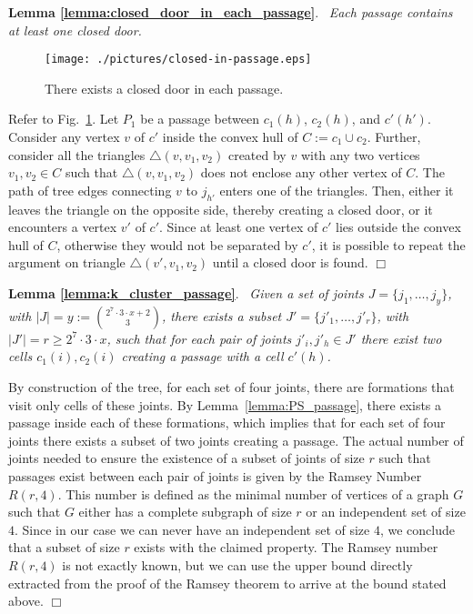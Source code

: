\documentclass[a4paper,10pt]{llncs}
\newcounter{prop}
\renewenvironment{proof}
{{\bf Proof:}}{\hspace*{\fill}$\Box$\par\vspace{2mm}}
\newcommand{\rephrase}[3]{\noindent\textbf{#1 #2}.~\emph{#3}}
\begin{document}
\rephrase{Lemma}{\ref{lemma:closed_door_in_each_passage}}{
Each passage contains at least one closed door.
}

\begin{figure}[ht]
\begin{center}
\texttt{[image: ./pictures/closed-in-passage.eps]}
\caption{There exists a closed door in each passage.}
\label{fig:closed_door_in_passage}
\end{center}
\end{figure}
\begin{proof}
Refer to Fig.~\ref{fig:closed_door_in_passage}. Let $P_1$ be a passage between $c_1(h)$, $c_2(h)$, and $c'(h')$. Consider any vertex $v$ of $c'$ inside the convex hull of $C:= c_1\cup c_2$. Further, consider all the triangles $\triangle(v,v_1,v_2)$ created by $v$ with any two vertices $v_1,v_2 \in C$ such that $\triangle(v,v_1,v_2)$ does not enclose any other vertex of $C$. The path of tree edges connecting $v$ to $j_{h'}$ enters one of the triangles. Then, either it leaves the triangle on the opposite side, thereby creating a closed door, or it encounters a vertex $v'$ of $c'$. Since at least one vertex of $c'$ lies outside the convex hull of $C$, otherwise they would not be separated by $c'$, it is possible to repeat the argument on triangle $\triangle(v',v_1,v_2)$ until a closed door is found.
\end{proof}

\rephrase{Lemma}{\ref{lemma:k_cluster_passage}}{
Given a set of joints $J=\{j_1,\ldots ,j_y\}$, with $|J|=y:= {2^7\cdot 3\cdot x + 2 \choose 3}$, there exists a subset $J'=\{j'_1,\ldots ,j'_r\}$, with $|J'|=r \geq 2^7\cdot 3\cdot x$, such that for each pair of joints $j'_i,j'_h \in J'$ there exist two cells $c_1(i),c_2(i)$ creating a passage with a cell $c'(h)$.
}

\begin{proof}
By construction of the tree, for each set of four joints, there are formations that visit only cells of these joints. By Lemma~\ref{lemma:PS_passage}, there exists a passage inside each of these formations, which implies that for each set of four joints there exists a subset of two joints creating a passage.
The actual number of joints needed to ensure the existence of a subset of joints of size $r$ such that passages exist between each pair of joints is given by the Ramsey Number $R(r,4)$. This number is defined as the minimal number of vertices of a graph $G$ such that $G$ either has a complete subgraph of size $r$ or an independent set of size $4$. Since in our case we can never have an independent set of size $4$, we conclude that a subset of size $r$ exists with the claimed property. The Ramsey number $R(r,4)$ is not exactly known, but we can use the upper bound directly extracted from the proof of the Ramsey theorem to arrive at the bound stated above. \cite{grs-rt-90}
\end{proof}
\end{document}
